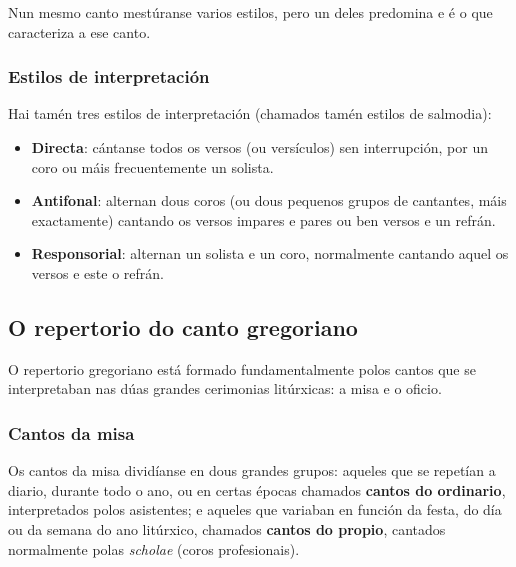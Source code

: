 \documentclass[a4paper, twoside]{templates/ociamthesis}
\providecommand{\tightlist}{%
  \setlength{\itemsep}{0pt}\setlength{\parskip}{0pt}}
\begin{document}
Nun mesmo canto mestúranse varios estilos, pero un deles predomina e é o que caracteriza a ese canto.

\hypertarget{estilos-de-interpretaciuxf3n}{%
\subsubsection{Estilos de interpretación}\label{estilos-de-interpretaciuxf3n}}

Hai tamén tres estilos de interpretación (chamados tamén estilos de salmodia):

\begin{itemize}
\tightlist
\item
  \textbf{Directa}: cántanse todos os versos (ou versículos) sen interrupción, por un coro ou máis frecuentemente un solista.
\item
  \textbf{Antifonal}: alternan dous coros (ou dous pequenos grupos de cantantes, máis exactamente) cantando os versos impares e pares ou ben versos e un refrán.
\item
  \textbf{Responsorial}: alternan un solista e un coro, normalmente cantando aquel os versos e este o refrán.
\end{itemize}

\hypertarget{o-repertorio-do-canto-gregoriano}{%
\subsection{O repertorio do canto gregoriano}\label{o-repertorio-do-canto-gregoriano}}

O repertorio gregoriano está formado fundamentalmente polos cantos que se interpretaban nas dúas grandes cerimonias litúrxicas: a misa e o oficio.

\hypertarget{cantos-da-misa}{%
\subsubsection{Cantos da misa}\label{cantos-da-misa}}

Os cantos da misa dividíanse en dous grandes grupos: aqueles que se repetían a diario, durante todo o ano, ou en certas épocas chamados \textbf{cantos do ordinario}, interpretados polos asistentes; e aqueles que variaban en función da festa, do día ou da semana do ano litúrxico, chamados \textbf{cantos do propio}, cantados normalmente polas \emph{scholae} (coros profesionais).
\end{document}
